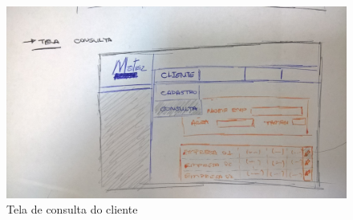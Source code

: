 \begin{apendicesenv}
\begin{figure}[!htb]
\centering
\includegraphics[scale=0.08]{figuras/tela02.jpg}
\caption{Tela de consulta do cliente}
\end{figure}

\end{apendicesenv}
